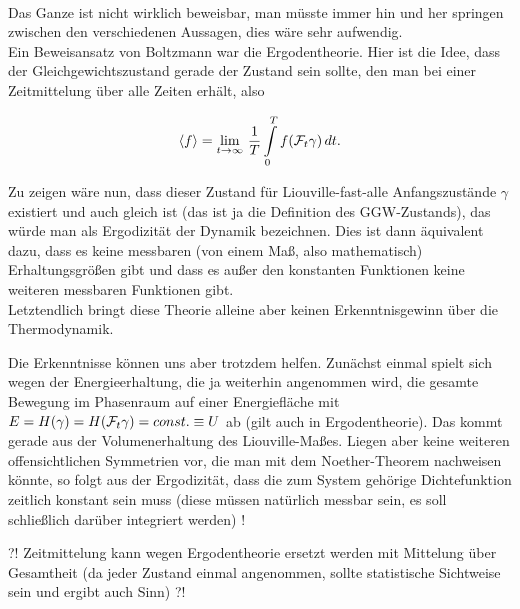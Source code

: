 \documentclass[../KlassMech_main.tex]{subfiles}
\begin{document}
	\\

Das Ganze ist nicht wirklich beweisbar, man müsste immer hin und her springen zwischen den verschiedenen Aussagen, dies wäre sehr aufwendig.\\
Ein Beweisansatz von Boltzmann war die Ergodentheorie. Hier ist die Idee, dass der Gleichgewichtszustand gerade der Zustand sein sollte, den man bei einer Zeitmittelung über alle Zeiten erhält, also

\begin{equation}\label{eq:ergod}
\expval{f} = \lim_{t \rightarrow \infty} \, \frac{1}{T} \int\limits_0^T f\qty(\mathcal{F}_t \gamma) \, dt .
\end{equation}

Zu zeigen wäre nun, dass dieser Zustand für Liouville-fast-alle Anfangszustände $\gamma$ existiert und auch gleich ist (das ist ja die Definition des GGW-Zustands), das würde man als Ergodizität der Dynamik bezeichnen. Dies ist dann äquivalent dazu, dass es keine messbaren (von einem Maß, also mathematisch) Erhaltungsgrößen gibt und dass es außer den konstanten Funktionen keine weiteren messbaren Funktionen gibt.\\
Letztendlich bringt diese Theorie alleine aber keinen Erkenntnisgewinn über die Thermodynamik.

Die Erkenntnisse können uns aber trotzdem helfen. Zunächst einmal spielt sich wegen der Energieerhaltung, die ja weiterhin angenommen wird, die gesamte Bewegung im Phasenraum auf einer Energiefläche mit $E = H\qty(\gamma) = H\qty(\mathcal{F}_t \gamma) = const. \equiv U$ ab (gilt auch in Ergodentheorie). Das kommt gerade aus der Volumenerhaltung des Liouville-Maßes. Liegen aber keine weiteren offensichtlichen Symmetrien vor, die man mit dem Noether-Theorem nachweisen könnte, so folgt aus der Ergodizität, dass die zum System gehörige Dichtefunktion zeitlich konstant sein muss (diese müssen natürlich messbar sein, es soll schließlich darüber integriert werden) !

?! Zeitmittelung kann wegen Ergodentheorie ersetzt werden mit Mittelung über Gesamtheit (da jeder Zustand einmal angenommen, sollte statistische Sichtweise sein und ergibt auch Sinn) ?!
\end{document}
